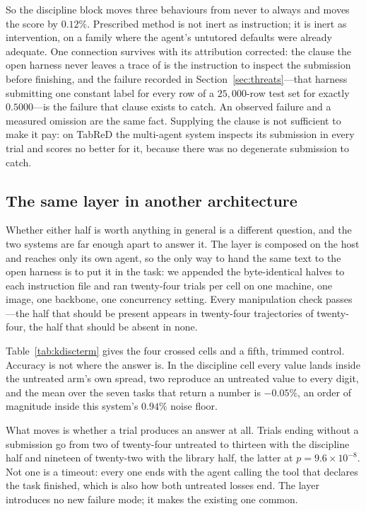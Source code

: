 So the discipline block moves three behaviours from never to always and moves the
score by $0.12\%$. Prescribed method is not inert as instruction; it is inert as
intervention, on a family where the agent's untutored defaults were already
adequate. One connection survives with its attribution corrected: the clause the
open harness never leaves a trace of is the instruction to inspect the submission
before finishing, and the failure recorded in Section~\ref{sec:threats}---that
harness submitting one constant label for every row of a $25{,}000$-row test set
for exactly $0.5000$---is the failure that clause exists to catch. An observed
failure and a measured omission are the same fact. Supplying the clause is not
sufficient to make it pay: on TabReD the multi-agent system inspects its
submission in every trial and scores no better for it, because there was no
degenerate submission to catch.

\subsection{The same layer in another architecture}
\label{sec:kdiscterm}

Whether either half is worth anything in general is a different question, and the
two systems are far enough apart to answer it. The layer is composed on the host
and reaches only its own agent, so the only way to hand the same text to the open
harness is to put it in the task: we appended the byte-identical halves to each
instruction file and ran twenty-four trials per cell on one machine, one image,
one backbone, one concurrency setting. Every manipulation check passes---the half
that should be present appears in twenty-four trajectories of twenty-four, the
half that should be absent in none.



Table~\ref{tab:kdiscterm} gives the four crossed cells and a fifth, trimmed control. Accuracy is not where the answer
is. In the discipline cell every value lands
inside the untreated arm's own spread, two reproduce an untreated value to every
digit, and the mean over the seven tasks that return a number is $-0.05\%$, an
order of magnitude inside this system's $0.94\%$ noise floor.

What moves is whether a trial produces an answer at all. Trials ending without a
submission go from two of twenty-four untreated to thirteen with the discipline
half and nineteen of twenty-two with the library half, the latter at
$p=9.6\times10^{-8}$. Not one is a timeout: every one ends with the agent calling
the tool that declares the task finished, which is also how both untreated losses
end. The layer introduces no new failure mode; it makes the existing one common.

